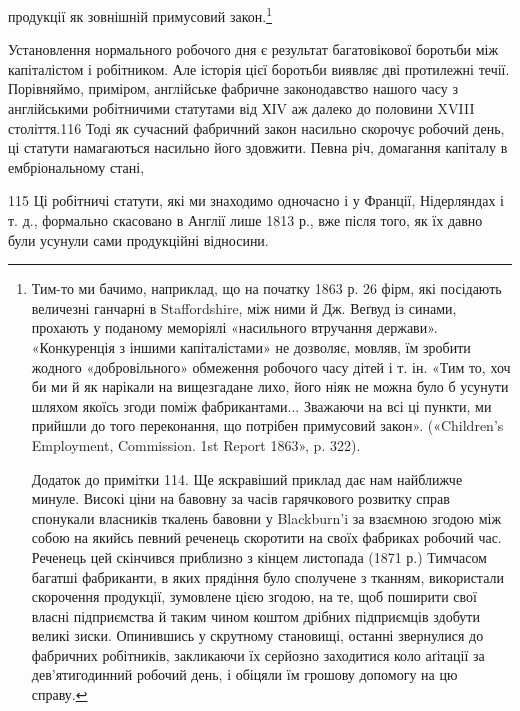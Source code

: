 продукції як зовнішній примусовий закон.\footnote{
Тим-то ми бачимо, наприклад, що на початку 1863 р. 26 фірм,
які посідають величезні ганчарні в Staffordshire, між ними й Дж. Веґвуд
із синами, прохають у поданому меморіялі «насильного втручання держави».
«Конкуренція з іншими капіталістами» не дозволяє, мовляв, їм
зробити жодного «добровільного» обмеження робочого часу дітей і т. ін.
«Тим то, хоч би ми й як нарікали на вищезгадане лихо, його ніяк не можна
було б усунути шляхом якоїсь згоди поміж фабрикантами... Зважаючи на
всі ці пункти, ми прийшли до того переконання, що потрібен примусовий
закон». («Children’s Employment, Commission. 1st Report 1863»,
p. 322).

Додаток до примітки 114. Ще яскравіший приклад дає нам найближче
минуле. Високі ціни на бавовну за часів гарячкового розвитку справ спонукали
власників ткалень бавовни у Blackburn’i за взаємною згодою між
собою на якийсь певний реченець скоротити на своїх фабриках робочий
час. Реченець цей скінчився приблизно з кінцем листопада (1871 р.)
Тимчасом багатші фабриканти, в яких прядіння було сполучене з тканням,
використали скорочення продукції, зумовлене цією згодою, на те, щоб
поширити свої власні підприємства й таким чином коштом дрібних підприємців
здобути великі зиски. Опинившись у скрутному становищі,
останні звернулися до фабричних робітників, закликаючи їх серйозно
заходитися коло аґітації за дев’ятигодинний робочий день, і обіцяли їм
грошову допомогу на цю справу.
}

Установлення нормального робочого дня є результат багатовікової
боротьби між капіталістом і робітником. Але історія цієї
боротьби виявляє дві протилежні течії. Порівняймо, приміром,
англійське фабричне законодавство нашого часу з англійськими
робітничими статутами від ХІV аж далеко до половини XVIII
століття.116 Тоді як сучасний фабричний закон насильно скорочує
робочий день, ці статути намагаються насильно його здовжити.
Певна річ, домагання капіталу в ембріональному стані,

115    Ці робітничі статути, які ми знаходимо одночасно і у Франції,
Нідерляндах і т. д., формально скасовано в Англії лише 1813 р., вже після
того, як їх давно були усунули сами продукційні відносини.
\parbreak{}  %
